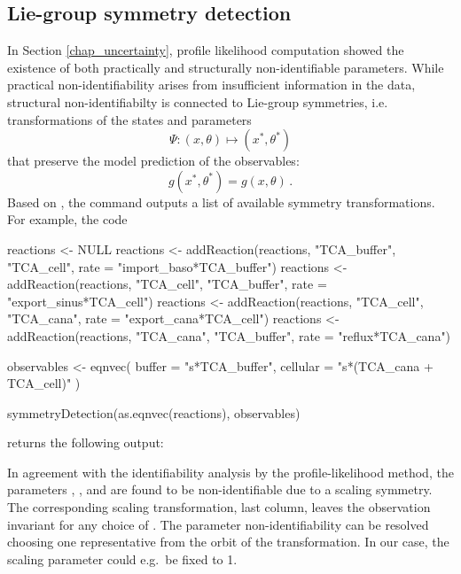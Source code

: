 \documentclass[article]{jss}
\begin{document}
\subsection{Lie-group symmetry detection}
In Section \ref{chap_uncertainty}, profile likelihood computation showed the existence of both practically and structurally non-identifiable parameters. While practical non-identifiability arises from insufficient information in the data, structural non-identifiabilty is connected to Lie-group symmetries, i.e. transformations of the states and parameters \[\Psi: (x,\theta) \longmapsto (x^*, \theta^*)\] that preserve the model prediction of the observables: \[g(x^*, \theta^*) = g(x,\theta)\,.\] Based on \citep{merkt2015higher}, the  command outputs a list of available symmetry transformations. For example, the code
\begin{CodeChunk}
\begin{CodeInput}
reactions <- NULL
reactions <- addReaction(reactions, "TCA_buffer", "TCA_cell", 
			 rate = "import_baso*TCA_buffer")
reactions <- addReaction(reactions, "TCA_cell", "TCA_buffer", 
			 rate = "export_sinus*TCA_cell")
reactions <- addReaction(reactions, "TCA_cell", "TCA_cana", 
			 rate = "export_cana*TCA_cell")
reactions <- addReaction(reactions, "TCA_cana", "TCA_buffer", 
			 rate = "reflux*TCA_cana")

observables <- eqnvec(
  buffer = "s*TCA_buffer",
  cellular = "s*(TCA_cana + TCA_cell)"
)

symmetryDetection(as.eqnvec(reactions), observables)
\end{CodeInput}
\end{CodeChunk}
returns the following output:
\begin{CodeChunk}
\end{CodeChunk}


In agreement with the identifiability analysis by the profile-likelihood method, the parameters , ,  and  are found to be non-identifiable due to a scaling symmetry. The corresponding scaling transformation, last column, leaves the observation invariant for any choice of . The parameter non-identifiability can be resolved choosing one representative from the orbit of the transformation. In our case, the scaling parameter could e.g.~be fixed to 1. 
\end{document}
